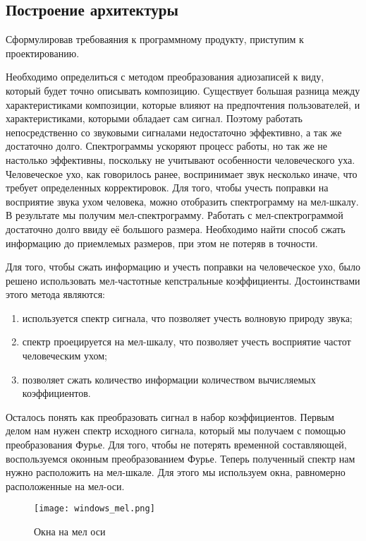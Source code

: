 \subsection{Построение архитектуры}
\label{sec:design:dev}

Сформулировав требоваяния к программному продукту, приступим к проектированию.

Необходимо определиться с методом преобразования адиозаписей к виду, который будет точно описывать композицию. Существует большая разница между характеристиками композиции, которые влияют на предпочтения пользователей, и характеристиками, которыми обладает сам сигнал. Поэтому работать непосредственно со звуковыми сигналами недостаточно эффективно, а так же достаточно долго. Спектрограммы ускоряют процесс работы, но так же не настолько эффективны, поскольку не учитывают особенности человеческого уха. Человеческое ухо, как говорилось ранее, воспринимает звук несколько иначе, что требует определенных корректировок. Для того, чтобы учесть поправки на восприятие звука ухом человека, можно отобразить спектрограмму на мел-шкалу. В результате мы получим мел-спектрограмму. Работать с мел-спектрограммой достаточно долго ввиду её большого размера. Необходимо найти способ сжать информацию до приемлемых размеров, при этом не потеряв в точности.

Для того, чтобы сжать информацию и учесть поправки на человеческое ухо, было решено использовать мел-частотные кепстральные коэффициенты. Достоинствами этого метода являются:
\begin{enumerate}
  \item используется спектр сигнала, что позволяет учесть волновую природу звука;
  \item спектр проецируется на мел-шкалу, что позволяет учесть восприятие частот человеческим ухом;
  \item позволяет сжать количество информации количеством вычисляемых коэффициентов.
\end{enumerate}

Осталось понять как преобразовать сигнал в набор коэффициентов. Первым делом нам нужен спектр исходного сигнала, который мы получаем с помощью преобразования Фурье. Для того, чтобы не потерять временной составляющей, воспользуемся оконным преобразованием Фурье. Теперь полученный спектр нам нужно расположить на мел-шкале. Для этого мы используем окна, равномерно расположенные на мел-оси.

\begin{figure}
\centering
	\texttt{[image: windows\_mel.png]}
	\caption{Окна на мел оси}
	\label{sec:design:dev:windows_mel}
\end{figure}

